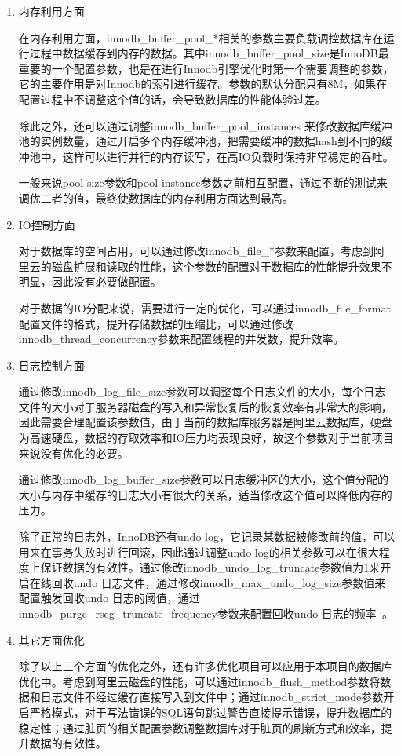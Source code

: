 \begin{enumerate}
\item 内存利用方面

在内存利用方面，innodb\_buffer\_pool\_*相关的参数主要负载调控数据库在运行过程中数据缓存到内存的数据。其中innodb\_buffer\_pool\_size是InnoDB最重要的一个配置参数，也是在进行Innodb引擎优化时第一个需要调整的参数，它的主要作用是对Innodb的索引进行缓存。参数的默认分配只有8M，如果在配置过程中不调整这个值的话，会导致数据库的性能体验过差。

除此之外，还可以通过调整innodb\_buffer\_pool\_instances 来修改数据库缓冲池的实例数量，通过开启多个内存缓冲池，把需要缓冲的数据hash到不同的缓冲池中，这样可以进行并行的内存读写，在高IO负载时保持非常稳定的吞吐。

一般来说pool size参数和pool instance参数之前相互配置，通过不断的测试来调优二者的值，最终使数据库的内存利用方面达到最高。
\item IO控制方面

对于数据库的空间占用，可以通过修改innodb\_file\_*参数来配置，考虑到阿里云的磁盘扩展和读取的性能，这个参数的配置对于数据库的性能提升效果不明显，因此没有必要做配置。

对于数据的IO分配来说，需要进行一定的优化，可以通过innodb\_file\_format配置文件的格式，提升存储数据的压缩比，可以通过修改innodb\_thread\_concurrency参数来配置线程的并发数，提升效率。
\item 日志控制方面

通过修改innodb\_log\_file\_size参数可以调整每个日志文件的大小，每个日志文件的大小对于服务器磁盘的写入和异常恢复后的恢复效率有非常大的影响，因此需要合理配置该参数值，由于当前的数据库服务器是阿里云数据库，硬盘为高速硬盘，数据的存取效率和IO压力均表现良好，故这个参数对于当前项目来说没有优化的必要。

通过修改innodb\_log\_buffer\_size参数可以日志缓冲区的大小，这个值分配的大小与内存中缓存的日志大小有很大的关系，适当修改这个值可以降低内存的压力。

除了正常的日志外，InnoDB还有undo log，它记录某数据被修改前的值，可以用来在事务失败时进行回滚，因此通过调整undo log的相关参数可以在很大程度上保证数据的有效性。通过修改innodb\_undo\_log\_truncate参数值为1来开启在线回收undo 日志文件，通过修改innodb\_max\_undo\_log\_size参数值来配置触发回收undo 日志的阈值，通过innodb\_purge\_rseg\_truncate\_frequency参数来配置回收undo 日志的频率~\cite{fruhwirt2010innodb}。
\item 其它方面优化

除了以上三个方面的优化之外，还有许多优化项目可以应用于本项目的数据库优化中。考虑到阿里云磁盘的性能，可以通过innodb\_flush\_method参数将数据和日志文件不经过缓存直接写入到文件中；通过innodb\_strict\_mode参数开启严格模式，对于写法错误的SQL语句跳过警告直接提示错误，提升数据库的稳定性；通过脏页的相关配置参数调整数据库对于脏页的刷新方式和效率，提升数据的有效性。
\end{enumerate}
